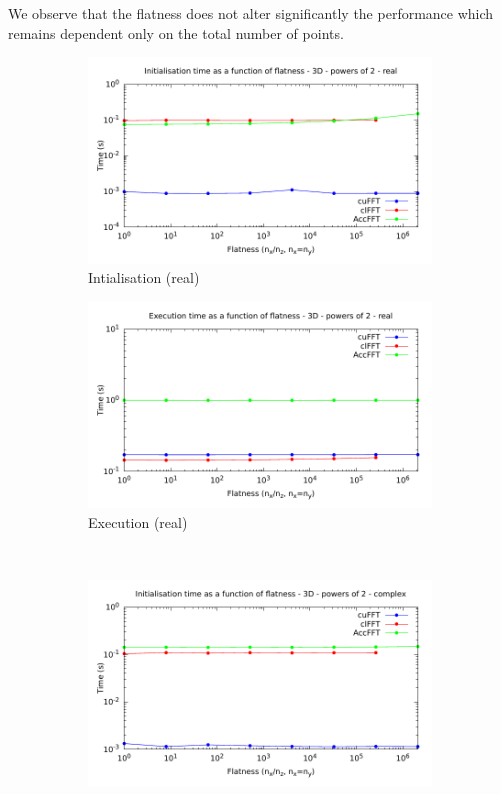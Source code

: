 \documentclass[12pt, a4paper]{article}
\begin{document}
We observe that the flatness does not alter significantly the
performance which remains dependent only on the total number of
points.

\begin{figure}[H]
\captionsetup{width=0.8\linewidth}
\centering
\begin{subfigure}{.5\textwidth}
\centering
\includegraphics[width=.9\linewidth]{graphs/flatness-r-init.pdf}
\caption{Intialisation (real)}
\label{FLAT1DRI}
\end{subfigure}%
\begin{subfigure}{.5\textwidth}
\centering
\includegraphics[width=.9\linewidth]{graphs/flatness-r-exec.pdf}
\caption{Execution (real)}
\label{FLAT1DRE}
\end{subfigure}\\
\begin{subfigure}{.5\textwidth}
\centering
\includegraphics[width=.9\linewidth]{graphs/flatness-c-init.pdf}

\end{subfigure}
\end{figure}
\end{document}
